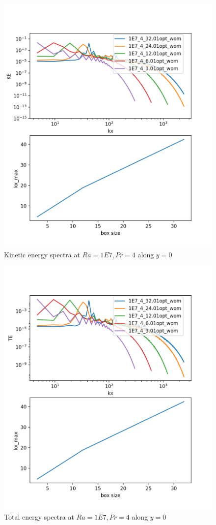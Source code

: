 \documentclass[12pt]{article}
\begin{document}
\begin{figure}[!htb]
	\includegraphics[width=\linewidth]{1E7_4_KE.png}
	\caption{ Kinetic energy spectra at $Ra = 1E7, Pr =4$ along $y = 0$}
	\label{fig:fig14}
\end{figure}

\begin{figure}[!htb]
	\includegraphics[width=\linewidth]{1E7_4_TE.png}
	\caption{ Total energy spectra at $Ra = 1E7, Pr =4$ along $y = 0$}
	\label{fig:fig15}
\end{figure}
\end{document}
